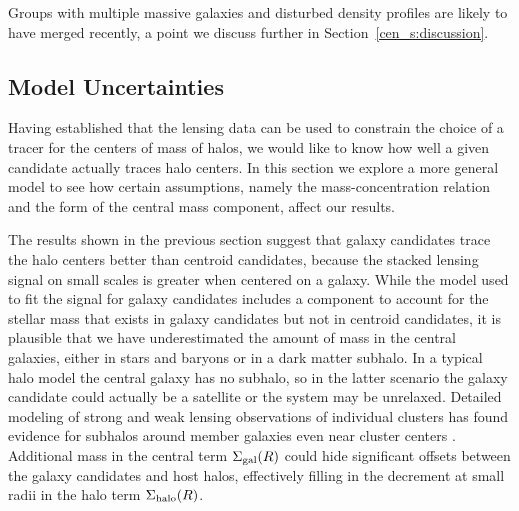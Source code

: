 Groups with multiple massive galaxies and disturbed
density profiles are likely to have merged recently, a point we
discuss further in Section~\ref{cen_s:discussion}.

\subsection{Model Uncertainties}
\label{cen_s:model_unc}

Having established that the lensing data can be used to
constrain the choice of a tracer for the centers of mass of halos, we would like to
know how well a given candidate actually traces halo centers. In this
section we explore a more general model to see how certain
assumptions, namely the mass-concentration relation and the form of
the central mass component, affect our results.

The results shown in the previous section suggest that galaxy
candidates trace the halo centers better than centroid candidates,
because the stacked lensing signal on small scales is greater when
centered on a galaxy. While the model used to fit the signal for
galaxy candidates includes a component to account for the stellar mass
that exists in galaxy candidates but not in centroid candidates, it is
plausible that we have underestimated the amount of mass in the
central galaxies, either in stars and baryons or in a dark matter
subhalo. In a typical halo model the central galaxy has no
subhalo, so in the latter scenario the galaxy candidate could actually be a
satellite or the system may be unrelaxed.
Detailed modeling of strong and weak lensing observations of
individual clusters has found evidence for subhalos around member
galaxies even near cluster centers \citep{Natarajan2007,
  Natarajan2009}. Additional mass in the central term $\Sigma_{\rm
  gal}(R)$ could hide 
significant offsets between the galaxy candidates and host halos,
effectively filling in the decrement at small radii in the halo term
$\Sigma_{\rm halo}(R)$.

